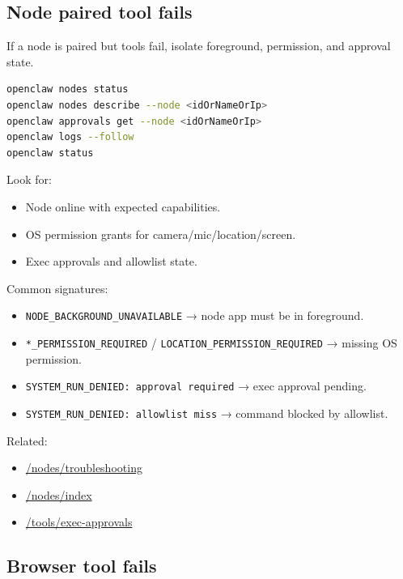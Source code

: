 \subsection{Node paired tool fails}


If a node is paired but tools fail, isolate foreground, permission, and approval state.

\begin{lstlisting}[language=bash]
openclaw nodes status
openclaw nodes describe --node <idOrNameOrIp>
openclaw approvals get --node <idOrNameOrIp>
openclaw logs --follow
openclaw status
\end{lstlisting}


Look for:

\begin{itemize}
  \item Node online with expected capabilities.
  \item OS permission grants for camera/mic/location/screen.
  \item Exec approvals and allowlist state.
\end{itemize}


Common signatures:

\begin{itemize}
  \item \texttt{NODE\_BACKGROUND\_UNAVAILABLE} → node app must be in foreground.
  \item \texttt{*\_PERMISSION\_REQUIRED} / \texttt{LOCATION\_PERMISSION\_REQUIRED} → missing OS permission.
  \item \texttt{SYSTEM\_RUN\_DENIED: approval required} → exec approval pending.
  \item \texttt{SYSTEM\_RUN\_DENIED: allowlist miss} → command blocked by allowlist.
\end{itemize}


Related:

\begin{itemize}
  \item \href{/nodes/troubleshooting}{/nodes/troubleshooting}
  \item \href{/nodes/index}{/nodes/index}
  \item \href{/tools/exec-approvals}{/tools/exec-approvals}
\end{itemize}


\subsection{Browser tool fails}


